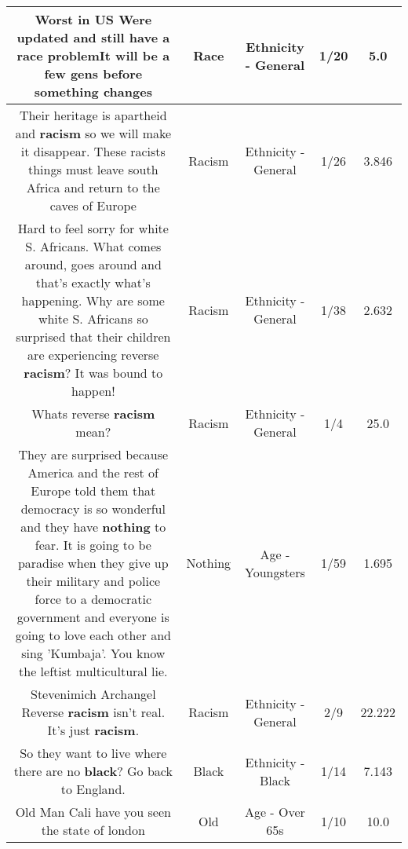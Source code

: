 \documentclass[11pt]{article}
\newlength\mylength
\begin{document}
\begin{center}
\begin{longtable}{|C{.65\mylength}|C{.30\mylength}|C{.12\mylength}|C{.12\mylength}|C{.12\mylength}|}
  \small Worst in US Were updated and still have a \textbf{race} problemIt will be a few gens before something changes\normalsize   & Race & Ethnicity - General & 1/20 & 5.0 \\  \hline
  \small Their heritage is apartheid and \textbf{racism} so we will make it disappear. These racists things must leave south Africa and return to the caves of Europe\normalsize   & Racism & Ethnicity - General & 1/26 & 3.846 \\  \hline
  \small Hard to feel sorry for white S. Africans.  What comes around, goes around and that's exactly what's happening.  Why are some white S. Africans so surprised that their children are experiencing reverse \textbf{racism}?  It was bound to happen!\normalsize   & Racism & Ethnicity - General & 1/38 & 2.632 \\  \hline
  \small Whats reverse \textbf{racism} mean?\normalsize   & Racism & Ethnicity - General & 1/4 & 25.0 \\  \hline
  \small They are surprised because America and the rest of Europe told them that democracy is so wonderful and they have \textbf{nothing} to fear. It is going to be paradise when they give up their military and police force to a democratic government and everyone is going to love each other and sing 'Kumbaja'. You know the leftist multicultural lie.\normalsize   & Nothing & Age - Youngsters & 1/59 & 1.695 \\  \hline
  \small Stevenimich Archangel Reverse \textbf{racism} isn't real. It's just \textbf{racism}.\normalsize   & Racism & Ethnicity - General & 2/9 & 22.222 \\  \hline
  \small So they want to live where there are no \textbf{black}? Go back to England.\normalsize   & Black & Ethnicity - Black & 1/14 & 7.143 \\  \hline
  \small Old Man Cali have you seen the state of london\normalsize   & Old & Age - Over 65s & 1/10 & 10.0 \\  \hline

\end{longtable}
\end{center}
\end{document}
